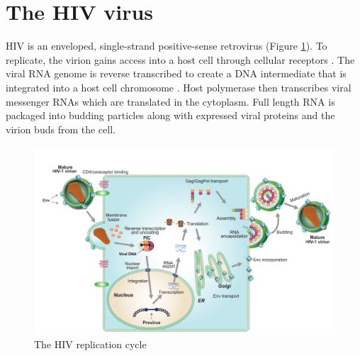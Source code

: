 \documentclass[../sherrill-Mix_thesis.tex]{subfiles}
\begin{document}
\section{The HIV virus}
	HIV is an enveloped, single-strand positive-sense retrovirus (Figure \ref{figHIVLifecycle}). To replicate, the virion gains access into a host cell through cellular receptors \citep{Dalgleish1984,Klatzmann1984,Lifson1986,Lifson1986a,Maddon1986,Feng1996,Choe1996,He1997}. The viral RNA genome is reverse transcribed to create a DNA intermediate that is integrated into a host cell chromosome \citep{Baltimore1970,Temin1970,Grandgenett1978,Bushman1990}. Host polymerase then transcribes viral messenger RNAs which are translated in the cytoplasm. Full length RNA is packaged into budding particles along with expressed viral proteins and the virion buds from the cell.


	\begin{figure}
		\centering
		\includegraphics[width=\textwidth]{lifecycle.pdf}
		\caption[The HIV replication cycle]{The HIV replication cycle} %
		\label{figHIVLifecycle}
	\end{figure}
\end{document}
